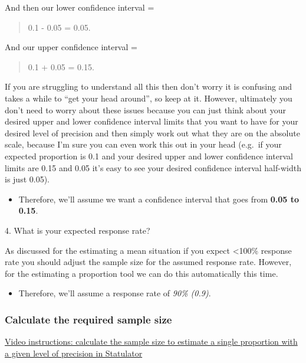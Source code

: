 \documentclass[
]{book}
\providecommand{\tightlist}{%
  \setlength{\itemsep}{0pt}\setlength{\parskip}{0pt}}
\begin{document}
And then our lower confidence interval =

\begin{quote}
0.1 - 0.05 = 0.05.
\end{quote}

And our upper confidence interval =

\begin{quote}
0.1 + 0.05 = 0.15.
\end{quote}

If you are struggling to understand all this then don't worry it is confusing and takes a while to ``get your head around'', so keep at it. However, ultimately you don't need to worry about these issues because you can just think about your desired upper and lower confidence interval limits that you want to have for your desired level of precision and then simply work out what they are on the absolute scale, because I'm sure you can even work this out in your head (e.g.~if your expected proportion is 0.1 and your desired upper and lower confidence interval limits are 0.15 and 0.05 it's easy to see your desired confidence interval half-width is just 0.05).

\begin{itemize}
\tightlist
\item
  Therefore, we'll assume we want a confidence interval that goes from \textbf{0.05 to 0.15}.
\end{itemize}

4. What is your expected response rate?

As discussed for the estimating a mean situation if you expect \textless100\% response rate you should adjust the sample size for the assumed response rate. However, for the estimating a proportion tool we can do this automatically this time.

\begin{itemize}
\tightlist
\item
  Therefore, we'll assume a response rate of \emph{90\% (0.9)}.
\end{itemize}

\hypertarget{calculate-the-required-sample-size-1}{%
\subsubsection{Calculate the required sample size}\label{calculate-the-required-sample-size-1}}

\href{https://youtu.be/ik5vvjN3wqM}{Video instructions: calculate the sample size to estimate a single proportion with a given level of precision in Statulator}
\end{document}

